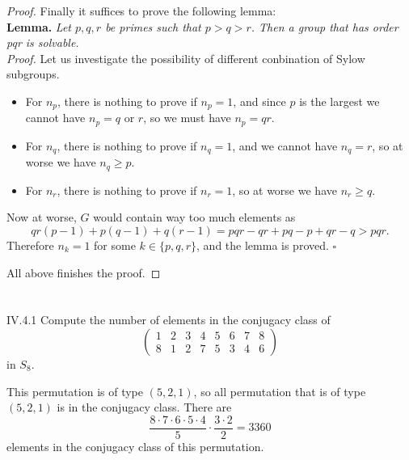 \begin{proof}
Finally it suffices to prove the following lemma: \\
\textbf{Lemma. }\textit{
Let $p,q,r$ be primes such that $p > q > r$. Then a group that has order pqr is solvable.
}\\
\emph{Proof. \;\;}Let us investigate the possibility of different conbination of Sylow subgroups. 
\begin{itemize}
\setlength\itemsep{0pt}
\item For $n_p$, there is nothing to prove if $n_p = 1$, and since $p$ is the largest we cannot have $n_p = q$ or $r$, so we must have $n_p = qr$.
\item For $n_q$, there is nothing to prove if $n_q = 1$, and we cannot have $n_q = r$, so at worse we have $n_q \geq p$.
\item For $n_r$, there is nothing to prove if $n_r = 1$, so at worse we have $n_r \geq q$.
\end{itemize}
Now at worse, $G$ would contain way too much elements as
\[
qr(p-1) + p(q-1) + q(r-1) = pqr - qr + pq - p + qr - q > pqr.
\]
Therefore $n_k = 1$ for some $k \in \{p,q,r\}$, and the lemma is proved. \hfill\ensuremath{\square}

All above finishes the proof.
\end{proof}


\section{}

\begin{problem}{IV.4.1}
Compute the number of elements in the conjugacy class of 
\[
\begin{pmatrix}
1 & 2 & 3 & 4 & 5 & 6 & 7 & 8 \\
8 & 1 & 2 & 7 & 5 & 3 & 4 & 6
\end{pmatrix}
\]
in $S_8$.
\end{problem}
\begin{solution}
This permutation is of type $(5,2,1)$, so all permutation that is of type $(5,2,1)$ is in the conjugacy class. There are 
\[
\frac{8\cdot 7 \cdot 6 \cdot 5 \cdot 4}{5} \cdot \frac{3 \cdot 2}{2} = 3360
\]
elements in the conjugacy class of this permutation.
\end{solution}

